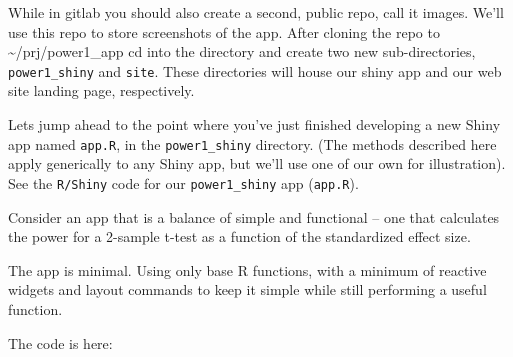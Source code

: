 \documentclass[
  letterpaper,
  DIV=11,
  numbers=noendperiod,
  oneside]{scrartcl}
\begin{document}
While in gitlab you should also create a second, public repo, call it
images. We'll use this repo to store screenshots of the app. After
cloning the repo to \textasciitilde/prj/power1\_app cd into the
directory and create two new sub-directories, \texttt{power1\_shiny} and
\texttt{site}. These directories will house our shiny app and our web
site landing page, respectively.

Lets jump ahead to the point where you've just finished developing a new
Shiny app named \texttt{app.R}, in the \texttt{power1\_shiny} directory.
(The methods described here apply generically to any Shiny app, but
we'll use one of our own for illustration). See the \texttt{R/Shiny}
code for our \texttt{power1\_shiny} app (\texttt{app.R}).

Consider an app that is a balance of simple and functional -- one that
calculates the power for a 2-sample t-test as a function of the
standardized effect size.

The app is minimal. Using only base R functions, with a minimum of
reactive widgets and layout commands to keep it simple while still
performing a useful function.

The code is here:
\end{document}
